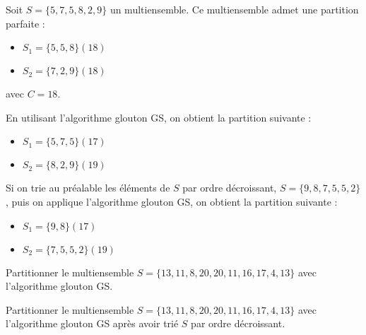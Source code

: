 \documentclass[11pt]{article}
\begin{document}
  \begin{exemple}{}
    Soit $S = \{5, 7, 5, 8, 2, 9\}$ un multiensemble. Ce multiensemble admet une partition parfaite :

    \begin{itemize}
      \item $S_1 = \{5, 5, 8\} (18)$
      \item $S_2 = \{7, 2, 9\} (18)$
    \end{itemize}

    avec $C = 18$.

    En utilisant l'algorithme glouton GS, on obtient la partition suivante : 

    \begin{itemize}
      \item $S_1 = \{5, 7, 5\} (17)$
      \item $S_2 = \{8, 2, 9\} (19)$
    \end{itemize}

    Si on trie au préalable les éléments de $S$ par ordre décroissant, $S = \{9, 8, 7, 5, 5, 2\}$, puis on applique l'algorithme glouton GS, on obtient la partition suivante :

    \begin{itemize}
      \item $S_1 = \{9, 8\} (17)$
      \item $S_2 = \{7, 5, 5, 2\} (19)$
    \end{itemize}
  \end{exemple}

  \begin{exercice}{}
    Partitionner le multiensemble $S=\{13, 11, 8, 20, 20, 11, 16, 17, 4, 13\}$ avec l'algorithme glouton GS.
  \end{exercice}


  \begin{exercice}{}
    Partitionner le multiensemble $S=\{13, 11, 8, 20, 20, 11, 16, 17, 4, 13\}$ avec l'algorithme glouton GS après avoir trié $S$ par ordre décroissant.
  \end{exercice}

\end{document}
